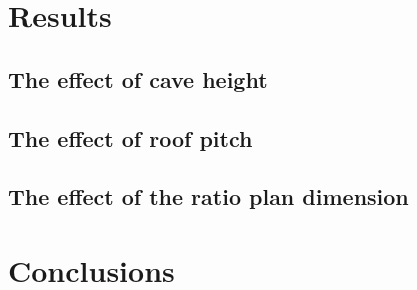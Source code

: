 \documentclass{beamer}
\begin{document}
\section{Results}
\subsection{The effect of cave height}
\subsection{The effect of roof pitch}
\subsection{The effect of the ratio plan dimension}

\section{Conclusions}


\begin{frame}
\end{frame}
\end{document}
